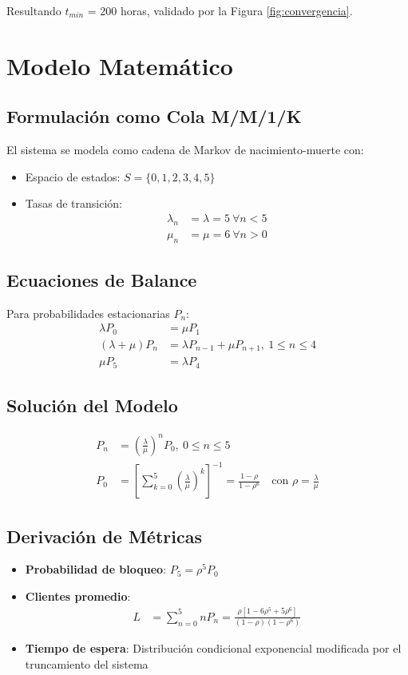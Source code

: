 \documentclass{article}
\begin{document}
Resultando $t_{min}$ = 200 horas, validado por la Figura \ref{fig:convergencia}.



\section{Modelo Matemático}
\subsection{Formulación como Cola M/M/1/K}
El sistema se modela como cadena de Markov de nacimiento-muerte con:
\begin{itemize}
    \item Espacio de estados: $S = \{0,1,2,3,4,5\}$
    \item Tasas de transición:
    \begin{align*}
        \lambda_n &= \lambda = 5\ \forall n < 5 \\
        \mu_n &= \mu = 6\ \forall n > 0
    \end{align*}
\end{itemize}

\subsection{Ecuaciones de Balance}
Para probabilidades estacionarias $P_n$:
\begin{align*}
    \lambda P_0 &= \mu P_1 \\
    (\lambda + \mu) P_n &= \lambda P_{n-1} + \mu P_{n+1},\ 1 \leq n \leq 4 \\
    \mu P_5 &= \lambda P_4
\end{align*}

\subsection{Solución del Modelo}
\begin{align*}
    P_n &= \left(\frac{\lambda}{\mu}\right)^n P_0,\ 0 \leq n \leq 5 \\
    P_0 &= \left[\sum_{k=0}^5 \left(\frac{\lambda}{\mu}\right)^k\right]^{-1} = \frac{1 - \rho}{1 - \rho^{6}} \quad \text{con } \rho = \frac{\lambda}{\mu}
\end{align*}

\subsection{Derivación de Métricas}
\begin{itemize}
    \item \textbf{Probabilidad de bloqueo}: $P_5 = \rho^5 P_0$
    \item \textbf{Clientes promedio}:
    \begin{align*}
        L &= \sum_{n=0}^5 n P_n = \frac{\rho[1 - 6\rho^5 + 5\rho^6]}{(1 - \rho)(1 - \rho^6)}
    \end{align*}
    \item \textbf{Tiempo de espera}: Distribución condicional exponencial modificada por el truncamiento del sistema
\end{itemize}
\end{document}
